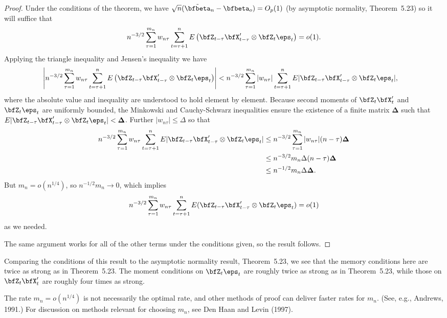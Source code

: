 \begin{proof}
Under the conditions of the theorem, we have $\sqrt{n}(\tilde{\bfbeta}_n - \bfbeta_o) = O_p(1)$ (by asymptotic normality, Theorem~5.23) so it will suffice that
\[
  n^{-3/2}\sum_{\tau=1}^{m_n}w_{n\tau}\sum_{t=\tau+1}^{n}E\left(\bfZ_{t-\tau}\bfX_{t-\tau}'\otimes\bfZ_t\eps_t\right) = o(1).
\]
Applying the triangle inequality and Jensen's inequality we have
\begin{align*}
  \left|n^{-3/2}\sum_{\tau=1}^{m_n}w_{n\tau}\sum_{t=\tau+1}^{n}E\left(\bfZ_{t-\tau}\bfX_{t-\tau}'\otimes\bfZ_t\eps_t\right)\right|
    &< n^{-3/2}\sum_{\tau=1}^{m_n}|w_{n\tau}|\sum_{t=\tau+1}^{n}E|\bfZ_{t-\tau}\bfX_{t-\tau}'\otimes\bfZ_t\eps_t|,
\end{align*}
where the absolute value and inequality are understood to hold element by element. Because second moments of $\bfZ_t\bfX_t'$ and $\bfZ_t\eps_t$ are uniformly bounded, the Minkowski and Cauchy-Schwarz inequalities ensure the existence of a finite matrix $\boldsymbol{\Delta}$ such that $E|\bfZ_{t-\tau}\bfX_{t-\tau}'\otimes\bfZ_t\eps_t| < \boldsymbol{\Delta}$. Further $|w_{n\tau}| \leq \Delta$ so that
\begin{align*}
  n^{-3/2}\sum_{\tau=1}^{m_n}w_{n\tau}\sum_{t=\tau+1}^{n}E|\bfZ_{t-\tau}\bfX_{t-\tau}'\otimes\bfZ_t\eps_t|
    &\leq n^{-3/2}\sum_{\tau=1}^{m_n}|w_{n\tau}|(n-\tau)\boldsymbol{\Delta} \\
    &\leq n^{-3/2}m_n\Delta(n-\tau)\boldsymbol{\Delta} \\
    &\leq n^{-1/2}m_n\Delta\boldsymbol{\Delta}.
\end{align*}
But $m_n = o(n^{1/4})$, so $n^{-1/2}m_n \to 0$, which implies
\[
  n^{-3/2}\sum_{\tau=1}^{m_n}w_{n\tau}\sum_{t=\tau+1}^{n}E(\bfZ_{t-\tau}\bfX_{t-\tau}'\otimes\bfZ_t\eps_t) = o(1)
\]
as we needed.

The same argument works for all of the other terms under the conditions given, so the result follows.
\end{proof}

Comparing the conditions of this result to the asymptotic normality result, Theorem~5.23, we see that the memory conditions here are twice as strong as in Theorem~5.23. The moment conditions on $\bfZ_t\eps_t$ are roughly twice as strong as in Theorem~5.23, while those on $\bfZ_t\bfX_t'$ are roughly four times as strong.

The rate $m_n = o(n^{1/4})$ is not necessarily the optimal rate, and other methods of proof can deliver faster rates for $m_n$. (See, e.g., Andrews, 1991.) For discussion on methods relevant for choosing $m_n$, see Den Haan and Levin (1997).

